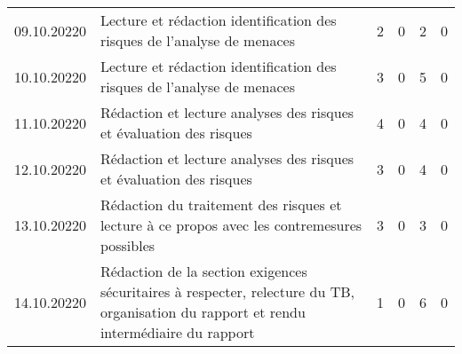 \begin{landscape}
\begin{longtable}[c]{lp{10cm}rrrr}
	09.10.20220 
	& Lecture et rédaction identification des risques de l'analyse de menaces
	& 2 %
	& 0 %
	& 2 %
	& 0\\ %
	
	10.10.20220 
	& Lecture et rédaction identification des risques de l'analyse de menaces
	& 3 %
	& 0 %
	& 5 %
	& 0\\ %
	
	11.10.20220 
	& Rédaction et lecture analyses des risques et évaluation des risques
	& 4 %
	& 0 %
	& 4 %
	& 0\\ %
	
	12.10.20220 
	& Rédaction et lecture analyses des risques et évaluation des risques
	& 3 %
	& 0 %
	& 4 %
	& 0\\ %
	
	13.10.20220 
	& Rédaction du traitement des risques et lecture à ce propos avec les contremesures possibles
	& 3 %
	& 0 %
	& 3 %
	& 0\\ %
	
	14.10.20220 
	& Rédaction de la section exigences sécuritaires à respecter, relecture du TB, organisation du rapport et rendu intermédiaire du rapport
	& 1 %
	& 0 %
	& 6 %
	& 0\\ %
	
\end{longtable}


\end{landscape}

